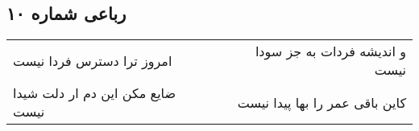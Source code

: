\begin{center}
\section*{رباعی شماره ۱۰}
\label{sec:sh010}
\begin{longtable}{l p{0.5cm} r}
امروز ترا دسترس فردا نیست
&&
و اندیشه فردات به جز سودا نیست
\\
ضایع مکن این دم ار دلت شیدا نیست
&&
کاین باقی عمر را بها پیدا نیست
\\
\end{longtable}
\end{center}
